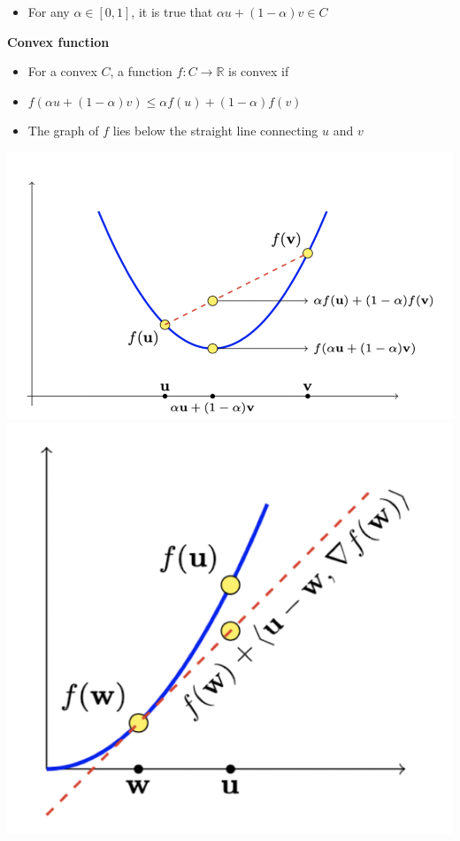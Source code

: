 \documentclass[7.5pt,a4paper, landscape]{article}
\begin{document}
\begin{multicols*}{4}
{\begin{minipage}[t]{\linewidth}
\begin{itemize}
        \item For any $\alpha \in [0,1]$, it is true that $\alpha u + (1 - \alpha)v \in C$
\end{itemize}

\textbf{Convex function}
\begin{itemize}
    \item For a convex $C$, a function $f : C \to \mathbb{R}$ is convex if
    \item $f(\alpha u + (1 - \alpha)v) \leq \alpha f(u) + (1 - \alpha)f(v)$
    \item The graph of $f$ lies below the straight line connecting $u$ and $v$
\end{itemize}

    \includegraphics[width=0.7\linewidth]{pic1.png}
\includegraphics[width=0.5\linewidth]{pic2.png}
\end{minipage}}

\fbox{\begin{minipage}[t]{\linewidth}


\end{minipage}}
\end{multicols*}
\end{document}
